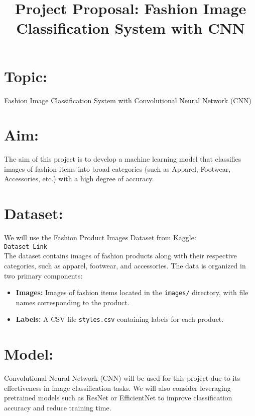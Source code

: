 \documentclass[12pt]{article}
\title{Project Proposal: Fashion Image Classification System with CNN}
\author{}
\date{}
\begin{document}
\maketitle



\section*{Topic:}
Fashion Image Classification System with Convolutional Neural Network (CNN)



\section*{Aim:}
The aim of this project is to develop a machine learning model that classifies images of fashion items into broad categories (such as Apparel, Footwear, Accessories, etc.) with a high degree of accuracy.



\section*{Dataset:}
We will use the Fashion Product Images Dataset from Kaggle: \\
\texttt{Dataset Link} \\
The dataset contains images of fashion products along with their respective categories, such as apparel, footwear, and accessories. The data is organized in two primary components:
\begin{itemize}
    \item \textbf{Images:} Images of fashion items located in the \texttt{images/} directory, with file names corresponding to the product.
    \item \textbf{Labels:} A CSV file \texttt{styles.csv} containing labels for each product.
\end{itemize}



\section*{Model:}
Convolutional Neural Network (CNN) will be used for this project due to its effectiveness in image classification tasks. We will also consider leveraging pretrained models such as ResNet or EfficientNet to improve classification accuracy and reduce training time.
\end{document}
